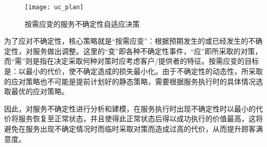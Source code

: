\begin{figure}[htbp]
\centering
\texttt{[image: uc\_plan]}
\caption{按需应变的服务不确定性自适应决策}\label{uc_plan}
\vspace{-1em}
\end{figure}

为了应对不确定性，核心策略就是“按需应变”：根据预期发生的或已经发生的不确定性，对服务做出调整。这里的“变”即各种不确定性事件，“应”即所采取的对策，而“需”则是指在决定采取何种对策时应考虑客户/提供者的特征。按需应变的目标是：以最小的代价，使不确定造成的损失最小化。由于不确定性的动态性，所采取的应对策略也不可能是提前计划好的静态策略，需要根据服务执行时的具体情况选取最优的应对策略。

因此，对服务不确定性进行分析和建模，在服务执行时出现不确定性时以最小的代价将服务恢复至正常状态，并且使得此正常状态后得以成功执行的价值最高，这将避免在服务出现不确定情况时而临时采取对策而造成过高的代价，从而提升顾客满意度。

